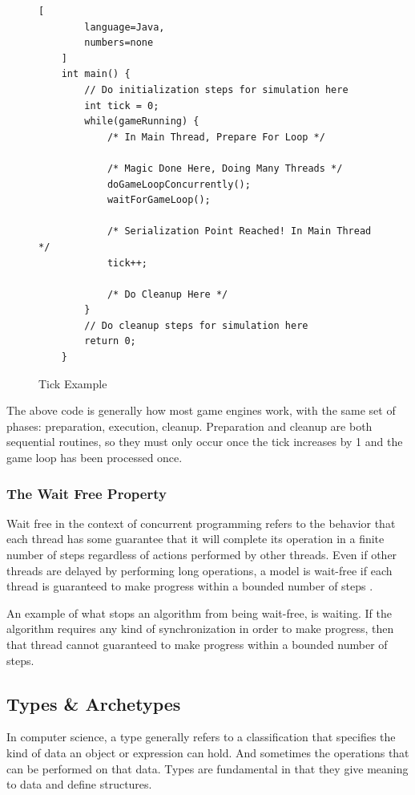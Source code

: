 \begin{figure}[H]
    \begin{lstlisting}[
        language=Java,
        numbers=none
    ]
    int main() {
        // Do initialization steps for simulation here
        int tick = 0;
        while(gameRunning) {
            /* In Main Thread, Prepare For Loop */    

            /* Magic Done Here, Doing Many Threads */
            doGameLoopConcurrently();
            waitForGameLoop();

            /* Serialization Point Reached! In Main Thread */
            tick++;

            /* Do Cleanup Here */
        }
        // Do cleanup steps for simulation here
        return 0;
    }
\end{lstlisting}
    \caption{Tick Example}
    \label{code:naive_ecs_data}
\end{figure}

The above code is generally how most game engines work, with the same set of phases: preparation, execution, cleanup. Preparation and cleanup are both sequential routines, so they must only occur once the tick increases by 1 and the game loop has been processed once.

\subsubsection{The Wait Free Property}
Wait free in the context of concurrent programming refers to the behavior that each thread has some guarantee that it will complete its operation in a finite number of steps regardless of actions performed by other threads. Even if other threads are delayed by performing long operations, a model is wait-free if each thread is guaranteed to make progress within a bounded number of steps \cite{Herlihy_2021b}.

An example of what stops an algorithm from being wait-free, is waiting. If the algorithm requires any kind of synchronization in order to make progress, then that thread cannot guaranteed to make progress within a bounded number of steps.

\subsection{Types \& Archetypes}
In computer science, a type generally refers to a classification that specifies the kind of data an object or expression can hold. And sometimes the operations that can be performed on that data. Types are fundamental in that they give meaning to data and define structures. 


